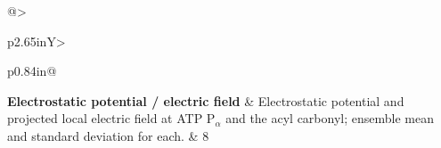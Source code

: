 \documentclass[11pt]{article}
\begin{document}
\begin{tabularx}{\textwidth}{@{}>{\raggedright\arraybackslash{}}p{2.65in}Y>{\raggedright\arraybackslash}p{0.84in}@{}}
\textbf{Electrostatic potential / electric field} & Electrostatic potential and projected local electric field at ATP P$_\alpha$ and the acyl carbonyl; ensemble mean and standard deviation for each. & 8 \\

\end{tabularx}
\end{document}
